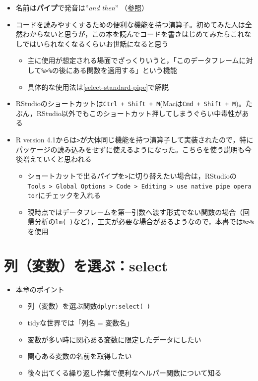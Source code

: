 \documentclass[
  xelatex,ja=standard, b5paper]{bxjsbook}
\providecommand{\tightlist}{%
  \setlength{\itemsep}{0pt}\setlength{\parskip}{0pt}}
\begin{document}
\begin{itemize}
\tightlist
\item
  名前は\textbf{パイプ}で発音は''\emph{and then}'' （\href{https://adv-r.hadley.nz/functions.html\#function-composition}{参照}）
\item
  コードを読みやすくするための便利な機能を持つ演算子。初めてみた人は全然わからないと思うが，この本を読んでコードを書きはじめてみたらこれなしではいられなくなるくらいお世話になると思う

  \begin{itemize}
  \tightlist
  \item
    主に使用が想定される場面でざっくりいうと，「このデータフレームに対して\texttt{\%\textgreater{}\%}の後にある関数を適用する」という機能
  \item
    具体的な使用法は\ref{select-standard-pipe}で解説
  \end{itemize}
\item
  RStudioのショートカットは\texttt{Ctrl\ +\ Shift\ +\ M}(Macは\texttt{Cmd\ +\ Shift\ +\ M})。たぶん，RStudio以外でもこのショートカット押してしまうぐらい中毒性がある
\item
  R version 4.1からは\texttt{\textbar{}\textgreater{}}が大体同じ機能を持つ演算子して実装されたので，特にパッケージの読み込みをせずに使えるようになった。こちらを使う説明も今後増えていくと思われる

  \begin{itemize}
  \tightlist
  \item
    ショートカットで出るパイプを\texttt{\textbar{}\textgreater{}}に切り替えたい場合は，RStudioの\texttt{Tools\ \textgreater{}\ Global\ Options\ \textgreater{}\ Code\ \textgreater{}\ Editing\ \textgreater{}\ use\ native\ pipe\ operator}にチェックを入れる
  \item
    現時点ではデータフレームを第一引数へ渡す形式でない関数の場合（回帰分析の\texttt{lm(\ )}など），工夫が必要な場合があるようなので，本書では\texttt{\%\textgreater{}\%}を使用
  \end{itemize}
\end{itemize}

\hypertarget{select}{%
\chapter{列（変数）を選ぶ：select}\label{select}}

\begin{itemize}
\tightlist
\item
  本章のポイント

  \begin{itemize}
  \tightlist
  \item
    列（変数）を選ぶ関数\texttt{dplyr:select(\ )}
  \item
    tidyな世界では「列名 = 変数名」
  \item
    変数が多い時に関心ある変数に限定したデータにしたい
  \item
    関心ある変数の名前を取得したい
  \item
    後々出てくる繰り返し作業で便利なヘルパー関数について知る
  \end{itemize}
\end{itemize}
\end{document}

